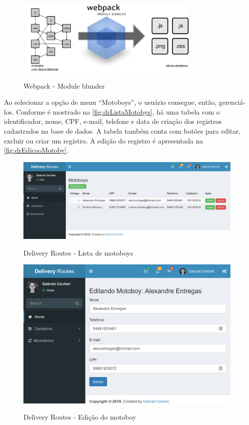 \begin{figure}[H]
    \centering
    \caption{Webpack - Module blunder}
    \includegraphics[width=0.8\textwidth]{./dados/figuras/fig17}
    \label{fig:webpack}
\end{figure}

\newpage
Ao selecionar a opção de menu “Motoboys”, o usuário consegue, então, gerenciá-los. Conforme é mostrado na \autoref{fig:drListaMotobys}, há uma tabela com o identificador, nome, CPF, e-mail, telefone e data de criação dos registros cadastrados na base de dados. A tabela também conta com botões para editar, excluir ou criar um registro. A edição do registro é apresentada na \autoref{fig:drEdicaoMotoby}.

\begin{figure}[H]
    \centering
    \caption{Delivery Routes - Lista de motoboys}
    \includegraphics[width=1.0\textwidth]{./dados/figuras/fig18}
    \label{fig:drListaMotobys}
\end{figure}

\begin{figure}[H]
    \centering
    \caption{Delivery Routes - Edição do motoboy}
    \includegraphics[width=1.0\textwidth]{./dados/figuras/fig19}
    \label{fig:drEdicaoMotoby}
\end{figure}

